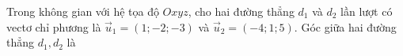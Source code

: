 \begin{ex}
Trong không gian với hệ tọa độ $Oxyz$, cho hai đường thẳng $d_1$ và $d_2$ lần lượt có vectơ chỉ phương là $\vec u_1=(1;-2;-3)$ và $\vec u_2=(-4;1;5)$. Góc giữa hai đường thẳng $d_1,d_2$ là
\end{ex}
